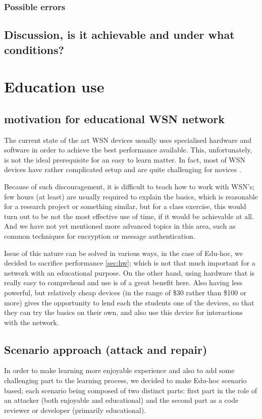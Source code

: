 \documentclass[
  print, %
  table,   %
  nolof,     %
  nolot,     %
           oneside
]{fithesis3}
\begin{document}
  \subsection{Possible errors}
  \section{Discussion, is it achievable and under what conditions?}


\chapter{Education use}\label{ch:edu}

  \section{motivation for educational WSN network}
  The current state of the art WSN devices usually uses specialised hardware and software in order to achieve the best performance available. %
  This, unfortunately, is not the ideal prerequisite for an easy to learn matter. In fact, most of WSN devices have rather complicated setup and are quite challenging for novices \cite{hu2010wireless}.

  Because of such discouragement, it is difficult to teach how to
  work with WSN’s; few hours (at least) are usually required
  to explain the basics, which is reasonable for a research project or
  something similar, but for a class exercise, this would turn out to be
  not the most effective use of time, if it would be achievable at all. And
  we have not yet mentioned more advanced topics in this area, such as
  common techniques for encryption or message authentication.

  Issue of this nature can be solved in various ways,
  in the case of Edu-hoc, we decided to sacrifice performance \ref{sec:hw}; which is not that much important for a network with an educational purpose. On the other hand, using hardware that is really easy to comprehend and use is of a great benefit here. Also having less powerful, but relatively cheap devices (in the range of \$30 rather than \$100 or more) gives the opportunity to lend each the students one of the devices, so that they can try the basics on their own, and also use this device for interactions with the network.

  \section{Scenario approach (attack and repair)}
  In order to make learning more enjoyable experience and also to add some challenging part to the learning process, we decided to make Edu-hoc scenario based; each scenario being composed of two distinct parts: first part in the role of an attacker (both enjoyable and educational) and the second part as a code reviewer or developer (primarily educational).
\end{document}
